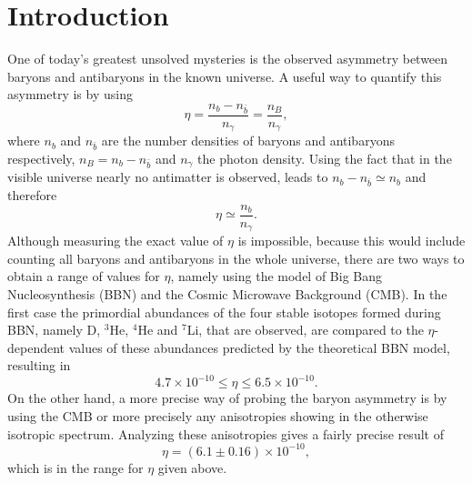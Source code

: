 \chapter{Introduction}
One of today's greatest unsolved mysteries is the observed asymmetry between baryons and antibaryons in the known universe. A useful way to quantify this asymmetry is by using
\begin{equation}
	\eta=\frac{n_b-n_{\bar{b}}}{n_\gamma}=\frac{n_B}{n_\gamma},
	\label{eq:asymmetry}
\end{equation}
where $n_b$ and $n_{\bar{b}}$ are the number densities of baryons and antibaryons respectively, $n_B=n_b-n_{\bar{b}}$ and $n_\gamma$ the photon density. Using the fact that in the visible universe nearly no antimatter is observed, leads to $n_b-n_{\bar{b}}\simeq n_b$ and therefore
\begin{equation}
\eta\simeq\frac{n_b}{n_\gamma}.
\end{equation}\newline \indent
Although measuring the exact value of $\eta$ is impossible, because this would include counting all baryons and antibaryons in the whole universe, there are two ways to obtain a range of values for $\eta$, namely using the model of Big Bang Nucleosynthesis (BBN) and the Cosmic Microwave Background (CMB)\cite{Sarkar:2002er}. In the first case the primordial abundances of the four stable isotopes formed during BBN, namely D, $^3$He, $^4$He and $^7$Li, that are observed, are compared to the $\eta$-dependent values of these abundances predicted by the theoretical BBN model, resulting in 
\cite[Eq. (1.25)]{Biondini:2016hhn}
\begin{equation}
	4.7\times10^{-10}\leq\eta\leq6.5\times10^{-10}.
\end{equation}
On the other hand, a more precise way of probing the baryon asymmetry is by using the CMB or more precisely any anisotropies showing in the otherwise isotropic spectrum. Analyzing these anisotropies gives a fairly precise result of \cite[Eq. (1.26)]{Biondini:2016hhn}
\begin{equation}
\eta=(6.1\pm0.16)\times10^{-10},
\label{eq:eta_value}
\end{equation}
which is in the range for $\eta$ given above.\newline \indent
